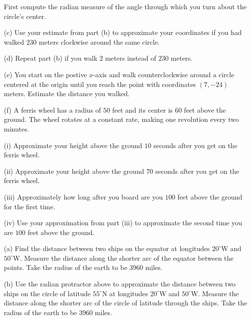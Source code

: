 \documentclass{ximera}
\begin{document}
\begin{question}
\begin{hint}
First compute the radian measure of the angle through which you turn about the circle's center.
\end{hint}

(c) Use your estimate from part (b) to approximate your coordinates if you had walked $230$ meters clockwise around the same circle.

(d) Repeat part (b) if you walk $2$ meters instead of $230$ meters.

(e) You start on the postive $x$-axis and walk counterclockwise around a circle centered at the origin until you reach the point with coordinates $(7,-24)$ meters. Estimate the distance you walked.  



(f) A ferris wheel has a radius of $50$ feet and its center is $60$ feet above the ground. The wheel rotates at a constant rate, making one revolution every two minutes.

(i) Approximate your height above the ground $10$ seconds after you get on the ferris wheel. 

(ii) Approximate your height above the ground $70$ seconds after you get on the ferris wheel. 

(iii) Approximately how long after you board are you $100$ feet above the ground for the first time.

(iv) Use your approximation from part (iii) to approximate the second time you are $100$ feet above the ground.


\begin{exploration}
 
\begin{onlineOnly}
    \begin{center}
\end{center}
\end{onlineOnly}
\end{exploration}

\end{question}


\begin{question}  \label{Q941F:Angles}
(a) Find the distance between two ships on the equator at longitudes $20^\circ$W and $50^\circ$W. Measure the distance along the shorter arc of the equator between the points. Take the radius of the earth to be $3960$ miles.

(b) Use the radian protractor above to approximate the distance between two ships on the circle of latitude $55^\circ$N at longitudes $20^\circ$W and $50^\circ$W. Measure the distance along the shorter arc of the circle of latitude through the ships.  Take the radius of the earth to be $3960$ miles.
\end{question}
\end{document}
